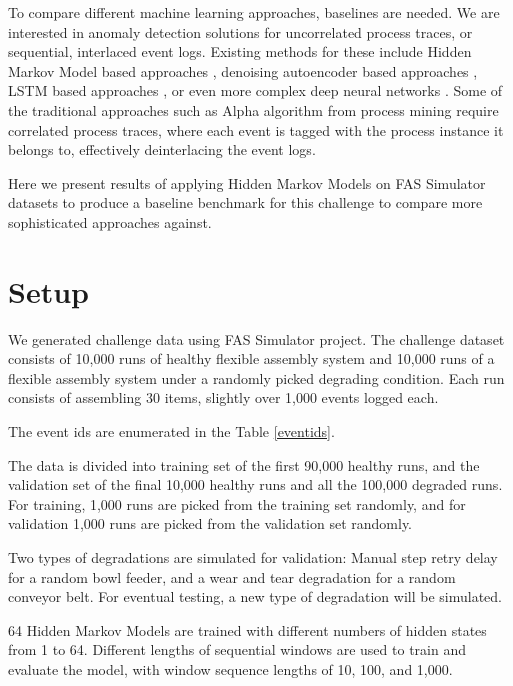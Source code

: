 \documentclass[journal]{IEEEtran}
\begin{document}
To compare different machine learning approaches, baselines are needed. We are interested in anomaly detection solutions for uncorrelated process traces, or sequential, interlaced event logs. Existing methods for these include Hidden Markov Model based approaches \cite{gornitz2015hidden}\cite{joshi2005investigating}, denoising autoencoder based approaches \cite{nolle2016unsupervised}, LSTM based approaches \cite{yuan2021recompose}\cite{du2017deeplog}, or even more complex deep neural networks \cite{zhang2019robust}. Some of the traditional approaches such as Alpha algorithm from process mining require correlated process traces, where each event is tagged with the process instance it belongs to, effectively deinterlacing the event logs.

Here we present results of applying Hidden Markov Models on FAS Simulator datasets to produce a baseline benchmark for this challenge to compare more sophisticated approaches against.

\section{Setup}

We generated challenge data using FAS Simulator project\cite{FASSimulator}. The challenge dataset consists of 10,000 runs of healthy flexible assembly system and 10,000 runs of a flexible assembly system under a randomly picked degrading condition. Each run consists of assembling 30 items, slightly over 1,000 events logged each.

The event ids are enumerated in the Table \ref{eventids}. 

The data is divided into training set of the first 90,000 healthy runs, and the validation set of the final 10,000 healthy runs and all the 100,000 degraded runs. For training, 1,000 runs are picked from the training set randomly, and for validation 1,000 runs are picked from the validation set randomly.

Two types of degradations are simulated for validation: Manual step retry delay for a random bowl feeder, and a wear and tear degradation for a random conveyor belt. For eventual testing, a new type of degradation will be simulated.

64 Hidden Markov Models are trained with different numbers of hidden states from 1 to 64. Different lengths of sequential windows are used to train and evaluate the model, with window sequence lengths of 10, 100, and 1,000.
\end{document}
